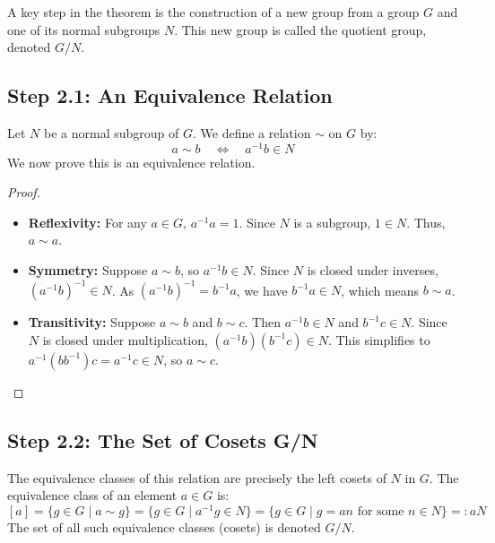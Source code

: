 A key step in the theorem is the construction of a new group from a group $G$ and one of its normal subgroups $N$. This new group is called the quotient group, denoted $G/N$.

\subsection*{Step 2.1: An Equivalence Relation}
Let $N$ be a normal subgroup of $G$. We define a relation $\sim$ on $G$ by:
\[
a \sim b \quad \iff \quad a^{-1}b \in N
\]
We now prove this is an equivalence relation.
\begin{proof}
\begin{itemize}
    \item \textbf{Reflexivity:} For any $a \in G$, $a^{-1}a = 1$. Since $N$ is a subgroup, $1 \in N$. Thus, $a \sim a$.
    \item \textbf{Symmetry:} Suppose $a \sim b$, so $a^{-1}b \in N$. Since $N$ is closed under inverses, $(a^{-1}b)^{-1} \in N$. As $(a^{-1}b)^{-1} = b^{-1}a$, we have $b^{-1}a \in N$, which means $b \sim a$.
    \item \textbf{Transitivity:} Suppose $a \sim b$ and $b \sim c$. Then $a^{-1}b \in N$ and $b^{-1}c \in N$. Since $N$ is closed under multiplication, $(a^{-1}b)(b^{-1}c) \in N$. This simplifies to $a^{-1}(bb^{-1})c = a^{-1}c \in N$, so $a \sim c$.
\end{itemize}
\end{proof}

\subsection*{Step 2.2: The Set of Cosets G/N}
The equivalence classes of this relation are precisely the left cosets of $N$ in $G$. The equivalence class of an element $a \in G$ is:
\[
[a] = \{ g \in G \mid a \sim g \} = \{ g \in G \mid a^{-1}g \in N \} = \{ g \in G \mid g = an \text{ for some } n \in N \} =: aN
\]
The set of all such equivalence classes (cosets) is denoted $G/N$.

